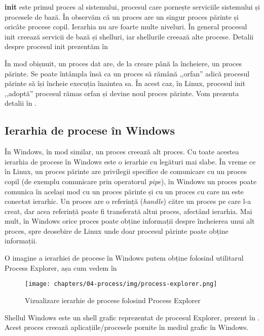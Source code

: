 \textbf{init} este primul proces al sistemului, procesul care pornește serviciile sistemului și procesele de bază.
În  observăm că un proces are un singur proces părinte și oricâte procese copil.
Ierarhia nu are foarte multe niveluri.
În general procesul init creează servicii de bază și shelluri, iar shellurile creează alte procese.
Detalii despre procesul init prezentăm în 

În mod obișnuit, un proces dat are, de la creare până la încheiere, un proces părinte.
Se poate întâmpla însă ca un proces să rămână ,,orfan'' adică procesul părinte să își încheie execuția înaintea sa.
În acest caz, în Linux, procesul init ,,adoptă'' procesul rămas orfan și devine noul proces părinte.
Vom prezenta detalii în .

\subsection{Ierarhia de procese în Windows}
\label{sec:process:windows-hierarchy}

În Windows, în mod similar, un proces creează alt proces.
Cu toate acestea ierarhia de procese în Windows este o ierarhie cu legături mai slabe.
În vreme ce în Linux, un proces părinte are privilegii specifice de comunicare cu un proces copil (de exemplu comunicare prin operatorul \textit{pipe}), în Windows un proces poate comunica în același mod cu un proces părinte și cu un proces cu care nu este conectat ierarhic.
Un proces are o referință (\textit{handle}) către un proces pe care l-a creat, dar acea referință poate fi transferată altui proces, afectând ierarhia.
Mai mult, în Windows orice proces poate obține informații despre încheierea unui alt proces, spre deosebire de Linux unde doar procesul părinte poate obține informații.

O imagine a ierarhiei de procese în Windows putem obține folosind utilitarul Process Explorer, așa cum vedem în 

\begin{figure}[!htbp]
  \centering
  \texttt{[image: chapters/04-process/img/process-explorer.png]}
  \caption{Vizualizare ierarhie de procese folosind Process Explorer}
  \label{fig:process:process-explorer-hierarchy}
\end{figure}

Shellul Windows este un shell grafic reprezentat de procesul Explorer, prezent în .
Acest proces creează aplicațiile/procesele pornite în mediul grafic în Windows.

